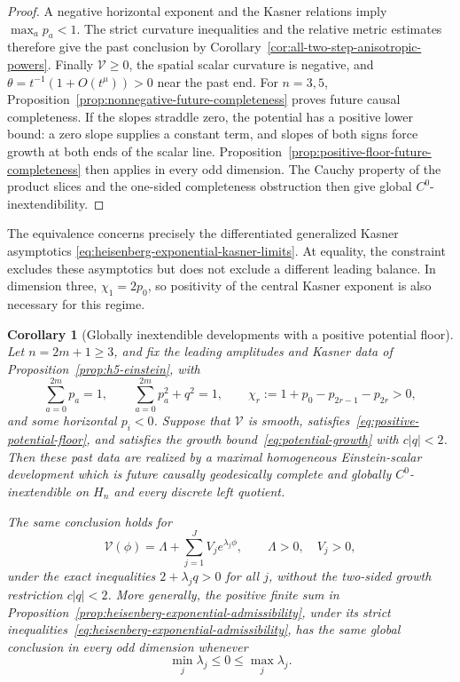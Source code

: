 \documentclass[10pt,a4paper]{article}
\numberwithin{equation}{section}
\newtheorem{corollary}[theorem]{Corollary}
\theoremstyle{definition}
\theoremstyle{remark}
\begin{document}
\begin{proof}
A negative horizontal exponent and the Kasner relations imply
$\max_a p_a<1$.  The strict curvature inequalities and the relative
metric estimates therefore give the past conclusion by
Corollary~\ref{cor:all-two-step-anisotropic-powers}.
Finally $\mathcal V\ge0$, the spatial scalar curvature is negative,
and $\theta=t^{-1}(1+O(t^\mu))>0$ near the past end.
For $n=3,5$, Proposition~\ref{prop:nonnegative-future-completeness}
proves future causal completeness.  If the slopes straddle zero, the
potential has a positive lower bound: a zero slope supplies a constant
term, and slopes of both signs force growth at both ends of the scalar
line.  Proposition~\ref{prop:positive-floor-future-completeness} then
applies in every odd dimension.  The Cauchy property of the
product slices and the one-sided completeness obstruction
\cite{GLS2018} then give global $C^0$-inextendibility.
\end{proof}

The equivalence concerns precisely the differentiated generalized
Kasner asymptotics \eqref{eq:heisenberg-exponential-kasner-limits}.
At equality, the constraint excludes these asymptotics but does not
exclude a different leading balance.  In dimension three,
$\chi_1=2p_0$, so positivity of the central Kasner exponent is also
necessary for this regime.

\begin{corollary}[Globally inextendible developments with a positive potential floor]
\label{cor:heisenberg-positive-floor}
Let $n=2m+1\ge3$, and fix the leading amplitudes and Kasner data of
Proposition~\ref{prop:h5-einstein}, with
\[
 \sum_{a=0}^{2m}p_a=1,\qquad
 \sum_{a=0}^{2m}p_a^2+q^2=1,\qquad
 \chi_r:=1+p_0-p_{2r-1}-p_{2r}>0,
\]
and some horizontal $p_i<0$.  Suppose that $\mathcal V$ is smooth,
satisfies~\eqref{eq:positive-potential-floor}, and satisfies the
growth bound~\eqref{eq:potential-growth} with $c|q|<2$.
Then these past data are realized by a maximal homogeneous
Einstein-scalar development which is future causally geodesically
complete and globally $C^0$-inextendible on $H_n$ and every discrete
left quotient.

The same conclusion holds for
\begin{equation}
 \mathcal V(\phi)=\Lambda+
        \sum_{j=1}^{J}V_j e^{\lambda_j\phi},
 \qquad \Lambda>0,\quad V_j>0,
 \label{eq:positive-floor-exponential-sum}
\end{equation}
under the exact inequalities $2+\lambda_jq>0$ for all $j$, without
the two-sided growth restriction $c|q|<2$.  More generally, the
positive finite sum in
Proposition~\ref{prop:heisenberg-exponential-admissibility}, under
its strict inequalities~\eqref{eq:heisenberg-exponential-admissibility},
has the same global conclusion in every odd dimension whenever
\begin{equation}
 \min_j\lambda_j\le0\le\max_j\lambda_j.
 \label{eq:exponential-sum-positive-floor}
\end{equation}
\end{corollary}
\end{document}
